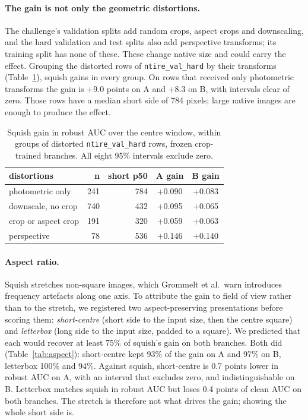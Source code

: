 \documentclass[10pt]{article}
\begin{document}
\paragraph{The gain is not only the geometric distortions.} The challenge's
validation splits add random crops, aspect crops and downscaling, and the
hard validation and test splits also add perspective transforms; its training
split has none of these.
These change native size and could carry the effect. Grouping the distorted
rows of \texttt{ntire\_val\_hard} by their transforms
(Table~\ref{tab:groups}), squish gains in every group. On rows that received
only photometric transforms the gain is +9.0 points on A and +8.3 on B, with
intervals clear of zero. Those rows have a median short side of 784 pixels;
large native images are enough to produce the effect.

\begin{table}[h]
\centering
\small
\begin{tabular}{lrrcc}
\toprule
distortions & n & short p50 & A gain & B gain \\
\midrule
photometric only & 241 & 784 & +0.090 & +0.083 \\
downscale, no crop & 740 & 432 & +0.095 & +0.065 \\
crop or aspect crop & 191 & 320 & +0.059 & +0.063 \\
perspective & 78 & 536 & +0.146 & +0.140 \\
\bottomrule
\end{tabular}
\caption{Squish gain in robust AUC over the centre window, within groups of
distorted \texttt{ntire\_val\_hard} rows, frozen crop-trained branches. All
eight 95\% intervals exclude zero.}
\label{tab:groups}
\end{table}

\paragraph{Aspect ratio.} Squish stretches non-square images, which
Grommelt et al.\ warn introduces frequency artefacts
along one axis. To attribute the gain to field of view
rather than to the stretch, we registered two aspect-preserving presentations
before scoring them: \emph{short-centre} (short side to the input size, then
the centre square) and \emph{letterbox} (long side to the input size, padded
to a square). We predicted that each would recover at least 75\% of squish's
gain on both branches. Both did (Table~\ref{tab:aspect}): short-centre kept
93\% of the gain on A and 97\% on B, letterbox 100\% and 94\%. Against squish,
short-centre is 0.7 points lower in robust AUC on A, with an interval that
excludes zero, and indistinguishable on B. Letterbox matches squish in robust
AUC but loses 0.4 points of clean AUC on both branches. The stretch is
therefore not what drives the gain; showing the whole short side is.
\end{document}
